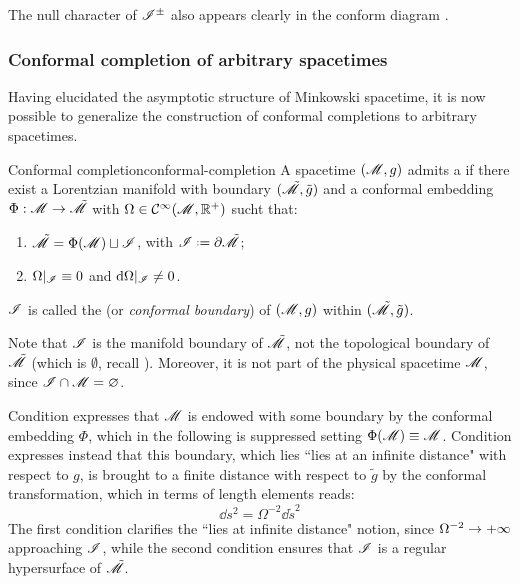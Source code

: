 The null character of $ \mathscr{I}^\pm $ also appears clearly in the conform diagram .

\subsubsection{Conformal completion of arbitrary spacetimes}

Having elucidated the asymptotic structure of Minkowski spacetime, it is now possible to generalize the construction of conformal completions to arbitrary spacetimes.

\begin{definition}{Conformal completion}{conformal-completion}
  A spacetime $ (\mathscr{M},g) $ admits a  if there exist a Lorentzian manifold with boundary $ (\tilde{\mathscr{M}} , \tilde{g}) $ and a conformal embedding $ \Phi : \mathscr{M} \rightarrow \tilde{\mathscr{M}} $ with $ \Omega \in \mathcal{C}^{\infty}(\mathscr{M} , \mathbb{R}^+) $ sucht that:
  \begin{enumerate}
    \item \label{item:cc-1} $ \tilde{\mathscr{M}} = \Phi(\mathscr{M}) \sqcup \mathscr{I} $, with $ \scri \defeq \pa \tilde{\man} $;
    \item \label{item:cc-2} $ \Omega \vert_\mathscr{I} \equiv 0 $ and $ \mathrm{d} \Omega \vert_\mathscr{I} \neq 0 $.
  \end{enumerate}
  $ \mathscr{I} $ is called the  (or \emph{conformal boundary}) of $ (\mathscr{M} , g) $ within $ (\tilde{\mathscr{M}} , \tilde{g}) $.
\end{definition}

Note that $ \mathscr{I} $ is the manifold boundary of $ \tilde{\mathscr{M}} $, not the topological boundary of $ \tilde{\mathscr{M}} $ (which is $ \emptyset $, recall ). Moreover, it is not part of the physical spacetime $ \mathscr{M} $, since $ \mathscr{I} \cap \mathscr{M} = \varnothing $.

Condition  expresses that $ \mathscr{M} $ is endowed with some boundary by the conformal embedding $ \Phi $, which in the following is suppressed setting $ \Phi(\mathscr{M}) \equiv \mathscr{M} $. Condition  expresses instead that this boundary, which lies ``lies at an infinite distance" with respect to $ g $, is brought to a finite distance with respect to $ \tilde{g} $ by the conformal transformation, which in terms of length elements reads:
\begin{equation*}
  \dd s^2 = \Omega^{-2} \dd \tilde{s}^2
\end{equation*}
The first condition  clarifies the ``lies at infinite distance" notion, since $ \Omega^{-2} \rightarrow + \infty $ approaching $ \mathscr{I} $, while the second condition  ensures that $ \mathscr{I} $ is a regular hypersurface of $ \tilde{\mathscr{M}} $.


